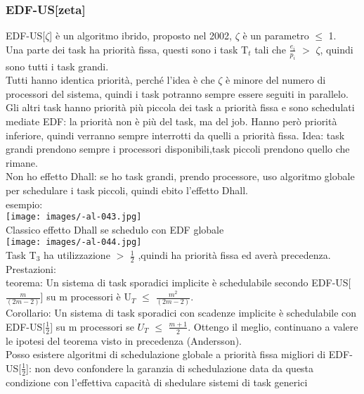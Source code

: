 \documentclass{article}
\begin{document}
\subsubsection{EDF-US[zeta]}
EDF-US[$\zeta$] è un algoritmo ibrido, proposto nel 2002, $\zeta$ è un parametro $\leq$ 1.\\ Una parte dei task ha priorità fissa, questi sono i task T$_t$ tali che $\frac{e_i}{p_i}$ $>$ $\zeta$, quindi sono tutti i task grandi.\\ Tutti hanno identica priorità, perché l'idea è che $\zeta$ è minore del numero di processori del sistema, quindi i task potranno sempre essere seguiti in parallelo.\\ Gli altri task hanno priorità più piccola dei task a priorità fissa e sono schedulati mediate EDF: la priorità non è più del task, ma del job. Hanno però priorità inferiore, quindi verranno sempre interrotti da quelli a priorità fissa. Idea: task grandi prendono sempre i processori disponibili,task piccoli prendono quello che rimane.\\ Non ho effetto Dhall: se ho task grandi, prendo processore, uso algoritmo globale per schedulare i task piccoli, quindi ebito l'effetto Dhall.\\ esempio:\\
\texttt{[image: images/-al-043.jpg]}\\
Classico effetto Dhall se schedulo con EDF globale\\
\texttt{[image: images/-al-044.jpg]}\\ Task T$_3$ ha utilizzazione $>$ $\frac{1}{2}$ ,quindi ha priorità fissa ed averà precedenza.\\ Prestazioni:\\ teorema: Un sistema di task sporadici implicite è  schedulabile secondo EDF-US[$\frac{m}{(2m-2)}$] su m processori è U$_T$ $\leq$ $\frac{m^2}{(2m-2)}$.\\ Corollario: Un sistema di task sporadici con scadenze implicite è schedulabile con EDF-US[$\frac{1}{2}$] su m processori se $U_T$ $\leq$ $\frac{m + 1}{2}$. Ottengo il meglio, continuano a valere le ipotesi del teorema visto in precedenza (Andersson).\\ Posso esistere algoritmi di schedulazione globale a priorità fissa migliori di EDF-US[$\frac{1}{2}$]: non devo confondere la garanzia di schedulazione data da questa condizione con l'effettiva capacità di shedulare sistemi di task generici
\end{document}
